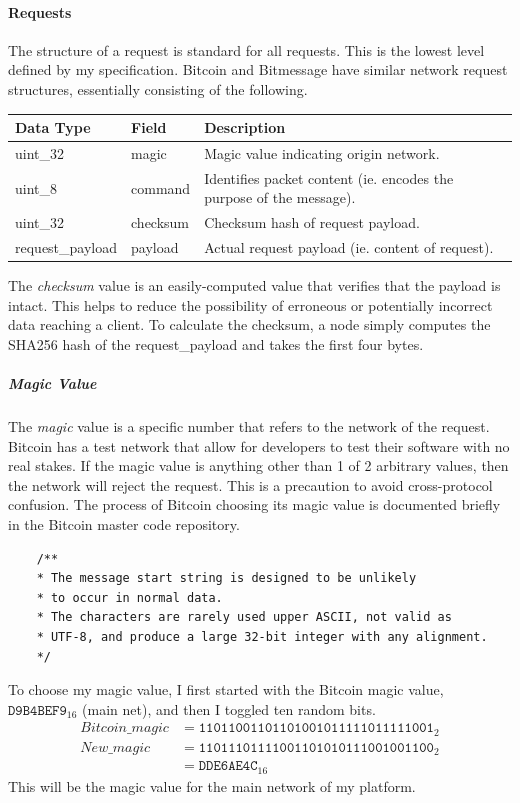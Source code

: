 \documentclass{article}
\begin{document}
\paragraph{Requests} \label{para:requests}
The structure of a request is standard for all requests. This is the lowest level defined by my specification. Bitcoin and Bitmessage have similar network request structures, essentially consisting of the following.
\begin{table}[H]
\centering
\begin{tabular}{|p{2.5cm}|p{2cm}|p{5.5cm}|}
\hline
\rowcolor{tblgrey} 
Data Type   & Field       & Description                                      \\ \hline
uint\_32    & magic       & Magic value indicating origin network.           \\ \hline
uint\_8     & command     & Identifies packet content (ie. encodes the purpose of the message). \\ \hline
uint\_32    & checksum    & Checksum hash of request payload.                \\ \hline
request\_payload & payload     & Actual request payload (ie. content of request). \\ \hline
\end{tabular}
\end{table}

The \textit{checksum} value is an easily-computed value that verifies that the payload is intact. This helps to reduce the possibility of erroneous or potentially incorrect data reaching a client. To calculate the checksum, a node simply computes the SHA256 hash of the request\_payload and takes the first four bytes.

\subparagraph{Magic Value}\label{subpara:magicval}
The \textit{magic} value is a specific number that refers to the network of the request. Bitcoin has a test network that allow for developers to test their software with no real stakes. If the magic value is anything other than 1 of 2 arbitrary values, then the network will reject the request. This is a precaution to avoid cross-protocol confusion.
The process of Bitcoin choosing its magic value is documented briefly in the Bitcoin master code repository\cite{bitcoin_magiccode}.
\begin{verbatim}
    /**
    * The message start string is designed to be unlikely
    * to occur in normal data.
    * The characters are rarely used upper ASCII, not valid as 
    * UTF-8, and produce a large 32-bit integer with any alignment.
    */
\end{verbatim}
To choose my magic value, I first started with the Bitcoin magic value, $\texttt{D9B4BEF9}_{16}$ (main net), and then I toggled ten random bits.
\begin{align*}
    \textit{Bitcoin\_magic} &= \texttt{11011001101101001011111011111001}_2   \\
    \textit{New\_magic} &= \texttt{11011101111001101010111001001100}_2       \\
                        &= \texttt{DDE6AE4C}_{16}
\end{align*}
This will be the magic value for the main network of my platform.
\end{document}
